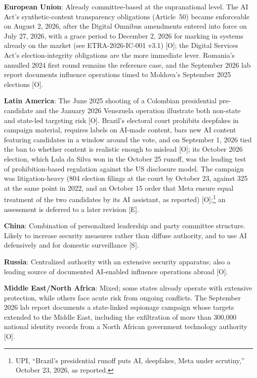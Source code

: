 \documentclass[11pt,letterpaper]{article}
\begin{document}
\textbf{European Union}: Already committee-based at the supranational level. The AI Act's synthetic-content transparency obligations (Article~50) became enforceable on August 2, 2026, after the Digital Omnibus amendments entered into force on July 27, 2026, with a grace period to December 2, 2026 for marking in systems already on the market (see ETRA-2026-IC-001 v3.1) [O]; the Digital Services Act's election-integrity obligations are the more immediate lever. Romania's annulled 2024 first round remains the reference case, and the September 2026 lab report documents influence operations timed to Moldova's September 2025 elections [O].

\textbf{Latin America}: The June 2025 shooting of a Colombian presidential pre-candidate and the January 2026 Venezuela operation illustrate both non-state and state-led targeting risk [O]. Brazil's electoral court prohibits deepfakes in campaign material, requires labels on AI-made content, bars new AI content featuring candidates in a window around the vote, and on September 1, 2026 tied the ban to whether content is realistic enough to mislead [O]; its October 2026 election, which Lula da Silva won in the October 25 runoff, was the leading test of prohibition-based regulation against the US disclosure model. The campaign was litigation-heavy (804 election filings at the court by October 23, against 325 at the same point in 2022, and an October 15 order that Meta ensure equal treatment of the two candidates by its AI assistant, as reported) [O];\footnote{UPI, ``Brazil's presidential runoff puts AI, deepfakes, Meta under scrutiny,'' October 23, 2026, as reported.} an assessment is deferred to a later revision [E].

\textbf{China}: Combination of personalized leadership and party committee structure. Likely to increase security measures rather than diffuse authority, and to use AI defensively and for domestic surveillance [S].

\textbf{Russia}: Centralized authority with an extensive security apparatus; also a leading source of documented AI-enabled influence operations abroad [O].

\textbf{Middle East/North Africa}: Mixed; some states already operate with extensive protection, while others face acute risk from ongoing conflicts. The September 2026 lab report documents a state-linked espionage campaign whose targets extended to the Middle East, including the exfiltration of more than 300,000 national identity records from a North African government technology authority [O].
\end{document}
